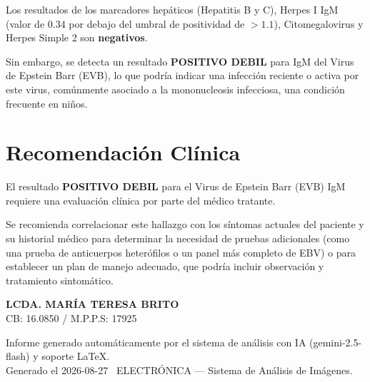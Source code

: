 \documentclass[11pt,a4paper]{article}
\begin{document}
Los resultados de los marcadores hepáticos (Hepatitis B y C), Herpes I IgM (valor de 0.34 por debajo del umbral de positividad de $>1.1$), Citomegalovirus y Herpes Simple 2 son \textbf{negativos}.

Sin embargo, se detecta un resultado \textbf{POSITIVO DEBIL} para IgM del Virus de Epstein Barr (EVB), lo que podría indicar una infección reciente o activa por este virus, comúnmente asociado a la mononucleosis infecciosa, una condición frecuente en niños.

\section*{Recomendación Clínica}

\begin{tcolorbox}[cajaAlerta, title={\faIcon{exclamation-triangle} ~Hallazgo a correlacionar clínicamente}]
  El resultado \textbf{POSITIVO DEBIL} para el Virus de Epstein Barr (EVB) IgM requiere una evaluación clínica por parte del médico tratante.
\end{tcolorbox}

\begin{tcolorbox}[cajaRecomendacion, title={\faIcon{user-md} ~Acción sugerida}]
  Se recomienda correlacionar este hallazgo con los síntomas actuales del paciente y su historial médico para determinar la necesidad de pruebas adicionales (como una prueba de anticuerpos heterófilos o un panel más completo de EBV) o para establecer un plan de manejo adecuado, que podría incluir observación y tratamiento sintomático.
\end{tcolorbox}

\vspace{10pt}
\begin{center}
  \textbf{LCDA. MARÍA TERESA BRITO}\\
  CB: 16.0850 / M.P.P.S: 17925
\end{center}

\vspace{14pt}
\begin{center}
  \footnotesize\color{gray}
  Informe generado automáticamente por el sistema de análisis con IA (gemini-2.5-flash) y soporte LaTeX. \\
  Generado el 2026-08-27 \textbullet\ ELECTRÓNICA --- Sistema de Análisis de Imágenes.
\end{center}
\end{document}
